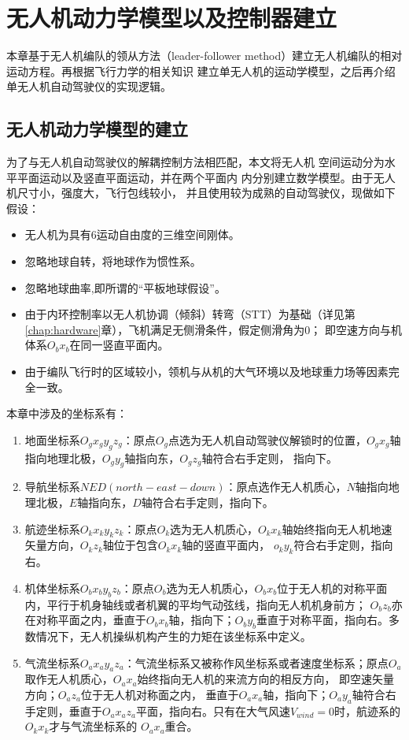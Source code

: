 %
%
%
%

\chapter{无人机动力学模型以及控制器建立}
\label{chap:formation_dynamic_equ}
本章基于无人机编队的领从方法（leader-follower method）建立无人机编队的相对运动方程。再根据飞行力学的相关知识
建立单无人机的运动学模型，之后再介绍单无人机自动驾驶仪的实现逻辑。
\section{无人机动力学模型的建立}
为了与无人机自动驾驶仪的解耦控制方法相匹配，本文将无人机
空间运动分为水平平面运动以及竖直平面运动，并在两个平面内
内分别建立数学模型。由于无人机尺寸小，强度大，飞行包线较小，
并且使用较为成熟的自动驾驶仪，现做如下假设：
\begin{itemize}
    \item 无人机为具有6运动自由度的三维空间刚体。
    \item 忽略地球自转，将地球作为惯性系。
    \item 忽略地球曲率,即所谓的“平板地球假设”。\cite{Wusentang2013}
    \item 由于内环控制率以无人机协调（倾斜）转弯（STT）为基础（详见第\ref{chap:hardware}章），飞机满足无侧滑条件，假定侧滑角为0；
        即空速方向与机体系$O_bx_b$在同一竖直平面内。
    \item 由于编队飞行时的区域较小，领机与从机的大气环境以及地球重力场等因素完全一致。
\end{itemize}
本章中涉及的坐标系有：
\begin{enumerate}
    \item 地面坐标系$O_gx_gy_gz_g$：原点$O_g$点选为无人机自动驾驶仪解锁时的位置，$O_gx_g$轴指向地理北极，$O_gy_g$轴指向东，$O_gz_g$轴符合右手定则，
        指向下。
    \item 导航坐标系$NED(north-east-down)$：原点选作无人机质心，$N$轴指向地理北极，$E$轴指向东，$D$轴符合右手定则，指向下。
    \item 航迹坐标系$O_kx_ky_kz_k$：原点$O_k$选为无人机质心，$O_kx_k$轴始终指向无人机地速矢量方向，$O_kz_k$轴位于包含$O_kx_k$轴的竖直平面内，
        $o_ky_k$符合右手定则，指向右。
    \item 机体坐标系$O_bx_by_bz_b$：原点$O_b$选为无人机质心，$O_bx_b$位于无人机的对称平面内，平行于机身轴线或者机翼的平均气动弦线，指向无人机机身前方；
        $O_bz_b$亦在对称平面之内，垂直于$O_bx_b$轴，指向下；$O_by_b$垂直于对称平面，指向右。多数情况下，无人机操纵机构产生的力矩在该坐标系中定义。
    \item 气流坐标系$O_ax_ay_az_a$：气流坐标系又被称作风坐标系或者速度坐标系；原点$O_a$取作无人机质心，$O_ax_a$始终指向无人机的来流方向的相反方向，
        即空速矢量方向；$O_az_a$位于无人机对称面之内，
        垂直于$O_ax_a$轴，指向下；$O_ay_a$轴符合右手定则，垂直于$O_ax_az_a$平面，指向右。只有在大气风速$V_{wind}=0$时，航迹系的$O_kx_k$才与气流坐标系的
        $O_ax_a$重合。
\end{enumerate}
